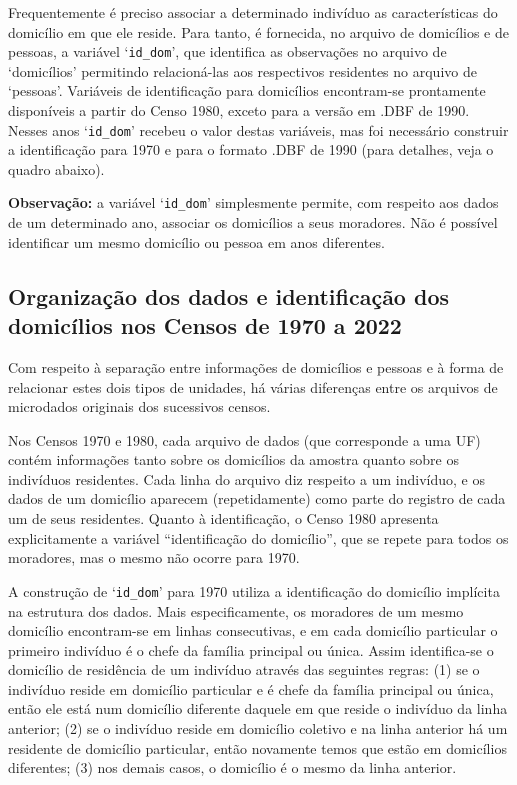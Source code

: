 \documentclass[12pt,a4paper]{article}
\newcommand{\vr}[1]{\texttt{#1}}
\begin{document}
Frequentemente é preciso associar a determinado indivíduo as características do domicílio em que ele reside. Para tanto, é fornecida, no arquivo de domicílios e de pessoas, a variável ‘\vr{id\_dom}’, que identifica as observações no arquivo de ‘domicílios’ permitindo relacioná-las aos respectivos residentes no arquivo de ‘pessoas’. Variáveis de identificação para domicílios encontram-se prontamente disponíveis a partir do Censo 1980, exceto para a versão em .DBF de 1990. Nesses anos ‘\vr{id\_dom}’ recebeu o valor destas variáveis, mas foi necessário construir a identificação para 1970 e para o formato .DBF de 1990 (para detalhes, veja o quadro abaixo).

\medskip
\textbf{Observação:} a variável ‘\vr{id\_dom}’ simplesmente permite, com respeito aos dados de um determinado ano, associar os domicílios a seus moradores. Não é possível identificar um mesmo domicílio ou pessoa em anos diferentes.

\subsection{Organização dos dados e identificação dos domicílios nos Censos de 1970 a 2022}
Com respeito à separação entre informações de domicílios e pessoas e à forma de relacionar estes dois tipos de unidades, há várias diferenças entre os arquivos de microdados originais dos sucessivos censos.

Nos Censos 1970 e 1980, cada arquivo de dados (que corresponde a uma UF) contém informações tanto sobre os domicílios da amostra quanto sobre os indivíduos residentes. Cada linha do arquivo diz respeito a um indivíduo, e os dados de um domicílio aparecem (repetidamente) como parte do registro de cada um de seus residentes. Quanto à identificação, o Censo 1980 apresenta explicitamente a variável “identificação do domicílio”, que se repete para todos os moradores, mas o mesmo não ocorre para 1970.

A construção de ‘\vr{id\_dom}’ para 1970 utiliza a identificação do domicílio implícita na estrutura dos dados. Mais especificamente, os moradores de um mesmo domicílio encontram-se em linhas consecutivas, e em cada domicílio particular o primeiro indivíduo é o chefe da família principal ou única. Assim identifica-se o domicílio de residência de um indivíduo através das seguintes regras: (1) se o indivíduo reside em domicílio particular e é chefe da família principal ou única, então ele está num domicílio diferente daquele em que reside o indivíduo da linha anterior; (2) se o indivíduo reside em domicílio coletivo e na linha anterior há um residente de domicílio particular, então novamente temos que estão em domicílios diferentes; (3) nos demais casos, o domicílio é o mesmo da linha anterior.
\end{document}
